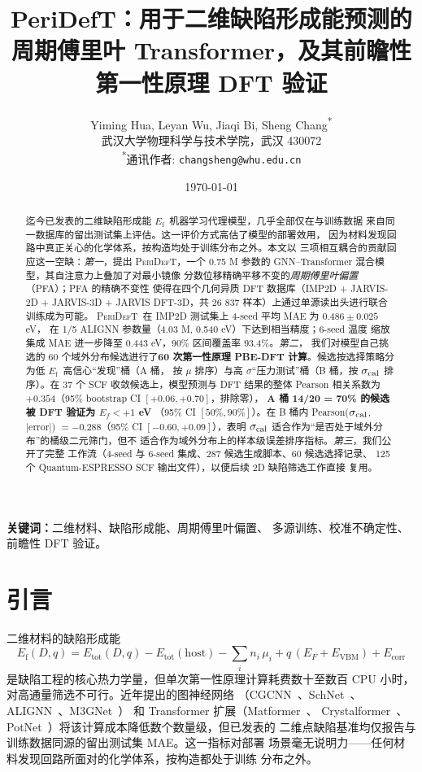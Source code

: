 \documentclass[UTF8,11pt,a4paper]{ctexart}
\title{\textbf{PeriDefT：用于二维缺陷形成能预测的周期傅里叶
Transformer，及其前瞻性第一性原理 DFT 验证}}
\author{%
  Yiming Hua, Leyan Wu, Jiaqi Bi, Sheng Chang\textsuperscript{*} \\[2pt]
  \small 武汉大学物理科学与技术学院，武汉 430072 \\[1pt]
  \small \textsuperscript{*}通讯作者: \texttt{changsheng@whu.edu.cn}
}
\date{\today}
\newcommand{\Ef}{$E_{\mathrm{f}}$}
\newcommand{\modelname}{\textsc{PeriDefT}}
\begin{document}
\maketitle

\begin{abstract}
\noindent
迄今已发表的二维缺陷形成能 \Ef\ 机器学习代理模型，几乎全部仅在与训练数据
来自同一数据库的留出测试集上评估。这一评价方式高估了模型的部署效用，
因为材料发现回路中真正关心的化学体系，按构造均处于训练分布之外。本文以
三项相互耦合的贡献回应这一空缺：\emph{第一}，提出 \modelname，一个
0.75 M 参数的 GNN--Transformer 混合模型，其自注意力上叠加了对最小镜像
分数位移精确平移不变的\emph{周期傅里叶偏置}（PFA）；PFA 的精确不变性
使得在四个几何异质 DFT 数据库（IMP2D + JARVIS-2D + JARVIS-3D +
JARVIS DFT-3D，共 26 837 样本）上通过单源读出头进行联合训练成为可能。
\modelname\ 在 IMP2D 测试集上 4-seed 平均 MAE 为 $0.486\pm0.025$ eV，
在 1/5 ALIGNN 参数量（4.03 M, 0.540 eV）下达到相当精度；6-seed 温度
缩放集成 MAE 进一步降至 0.443 eV，90\% 区间覆盖率 93.4\%。\emph{第二}，
我们对模型自己挑选的 60 个域外分布候选进行了\textbf{60 次第一性原理
PBE-DFT 计算}。候选按选择策略分为低 \Ef\ 高信心``发现''桶（A 桶，
按 $\mu$ 排序）与高 $\sigma$``压力测试''桶（B 桶，按 $\sigma_{\rm cal}$
排序）。在 37 个 SCF 收敛候选上，模型预测与 DFT 结果的整体 Pearson
相关系数为 $+0.354$（95\% bootstrap CI $[+0.06, +0.70]$，排除零），
\textbf{A 桶 14/20 = 70\% 的候选被 DFT 验证为 $E_f < +1$ eV}
（95\% CI $[50\%, 90\%]$）。在 B 桶内 Pearson($\sigma_{\rm cal}$,
$|\mathrm{error}|$) $= -0.288$（95\% CI $[-0.60, +0.09]$），表明
$\sigma_{\rm cal}$ 适合作为``是否处于域外分布''的桶级二元筛门，但不
适合作为域外分布上的样本级误差排序指标。\emph{第三}，我们公开了完整
工作流（4-seed 与 6-seed 集成、287 候选生成脚本、60 候选选择记录、
125 个 Quantum-ESPRESSO SCF 输出文件），以便后续 2D 缺陷筛选工作直接
复用。
\end{abstract}

\bigskip
\noindent\textbf{关键词：}二维材料、缺陷形成能、周期傅里叶偏置、
多源训练、校准不确定性、前瞻性 DFT 验证。

\section{引言}\label{sec:intro}

二维材料的缺陷形成能
\begin{equation}
E_{\mathrm{f}}(D, q) = E_{\mathrm{tot}}(D, q) - E_{\mathrm{tot}}(\mathrm{host})
- \sum_i n_i\,\mu_i + q\,(E_F + E_{\mathrm{VBM}}) + E_{\mathrm{corr}}
\label{eq:Ef}
\end{equation}
是缺陷工程的核心热力学量，但单次第一性原理计算耗费数十至数百 CPU 小时，
对高通量筛选不可行。近年提出的图神经网络
（CGCNN~\cite{Xie2018CGCNN}、SchNet~\cite{Schutt2018SchNet}、
ALIGNN~\cite{Choudhary2021ALIGNN}、M3GNet~\cite{Chen2022M3GNet}）
和 Transformer 扩展（Matformer~\cite{Yan2022Matformer}、
Crystalformer~\cite{Taniai2024Crystalformer}、
PotNet~\cite{Lin2023PotNet}）将该计算成本降低数个数量级，但已发表的
二维点缺陷基准均仅报告与训练数据同源的留出测试集 MAE。这一指标对部署
场景毫无说明力——任何材料发现回路所面对的化学体系，按构造都处于训练
分布之外。
\end{document}
